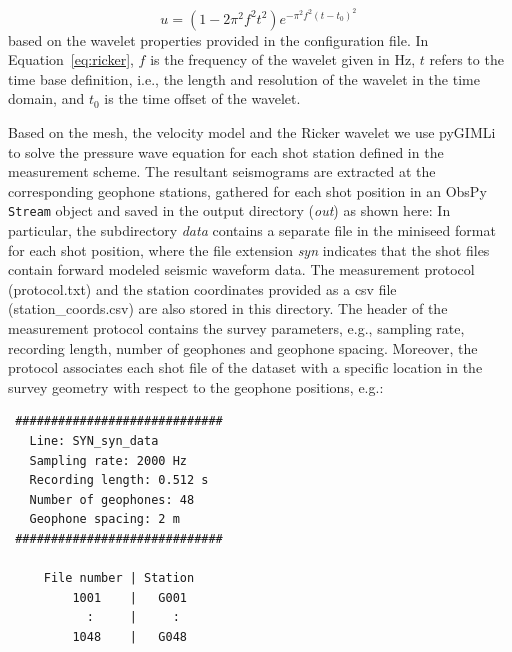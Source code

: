 \documentclass[a4paper,fleqn]{cas-sc}
\begin{document}
\begin{equation}
	u = \left(1-2\pi^2f^2t^2\right)e^{-\pi^2f^2\left(t-t_0\right)^2}\,
	\label{eq:ricker}
\end{equation}
based on the wavelet properties provided in the configuration file. In Equation~\ref{eq:ricker}, $f$ is the frequency of the wavelet given in \unit{Hz}, $t$ refers to the time base definition, i.e., the length and resolution of the wavelet in the time domain, and $t_0$ is the time offset of the wavelet.

Based on the mesh, the velocity model and the Ricker wavelet we use pyGIMLi 
to solve the pressure wave equation for each shot station defined in the measurement scheme.
The resultant seismograms are extracted at the corresponding geophone stations, gathered for each shot position in an ObsPy \texttt{Stream} object and saved in the output directory (\textit{out}) as shown here:
In particular, the subdirectory \textit{data} contains a separate file in the miniseed format \citep{ahern2012, ringler2015} for each shot position, where the file extension \textit{syn} indicates that the shot files contain forward modeled seismic waveform data. 
The measurement protocol (protocol.txt) and the station coordinates provided as a csv file (station\_coords.csv) are also stored in this directory. The header of the measurement protocol contains the survey parameters, e.g., sampling rate, recording length, number of geophones and geophone spacing. Moreover, the protocol associates each shot file of the dataset with a specific location in the survey geometry with respect to the geophone positions, e.g.:
\begin{footnotesize}
\begin{verbatim}
 #############################
   Line: SYN_syn_data             
   Sampling rate: 2000 Hz    
   Recording length: 0.512 s 
   Number of geophones: 48   
   Geophone spacing: 2 m     
 #############################
 
     File number | Station
         1001    |   G001
           :     |     :
         1048    |   G048
\end{verbatim}
\end{footnotesize}
\end{document}
